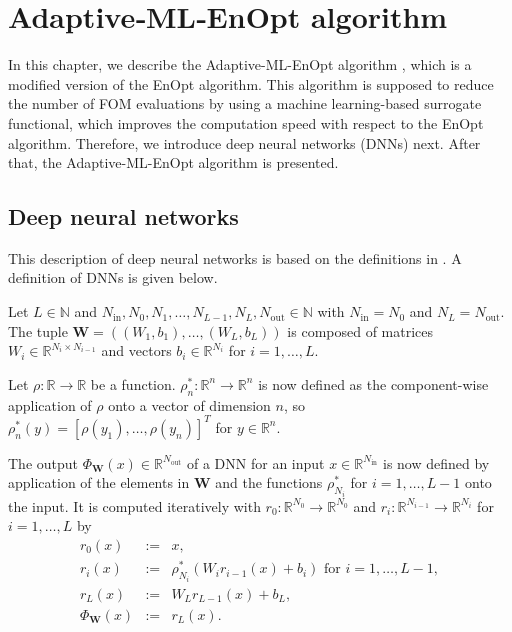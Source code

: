\chapter{\label{ChapterAdaptiveMLEnOptAlgorithm}Adaptive‑ML‑EnOpt algorithm}

In this chapter, we describe the Adaptive-ML-EnOpt algorithm \cite{Keil2022-dj}, which is a modified version of the EnOpt algorithm. This algorithm is supposed to reduce the number of FOM evaluations by using a machine learning-based surrogate functional, which improves the computation speed with respect to the EnOpt algorithm. Therefore, we introduce deep neural networks (DNNs) next. After that, the Adaptive-ML-EnOpt algorithm is presented.

\section{\label{sectionDeepNeuralNetworks}Deep neural networks}

This description of deep neural networks is based on the definitions in \cite{Keil2022-dj}. A definition of DNNs is given below.

\begin{defn}
\label{defDNN}
Let $L\in\mathbb{N}$ and $N_{\mathrm{in}},N_0,N_1,\dotsc,N_{L-1}, N_L,N_{\mathrm{out}}\in\mathbb{N}$ with $N_{\mathrm{in}}=N_0$ and $ N_L=N_{\mathrm{out}}$. The tuple $\mathbf{W}=\left((W_1,b_1),\dotsc,(W_L,b_L)\right)$ is composed of matrices $W_i\in\mathbb{R}^{N_i\times N_{i-1}}$ and vectors $b_i\in\mathbb{R}^{N_i}$ for $i=1,\dotsc,L$.

Let $\rho:\mathbb{R}\to\mathbb{R}$ be a function. $\rho_n^*:\mathbb{R}^n\to\mathbb{R}^n$ is now defined as the component-wise application of $\rho$ onto a vector of dimension $n$, so $\rho_n^*(y)=\left[\rho(y_1),\dotsc,\rho(y_n)\right]^T$ for $y\in\mathbb{R}^n$.

The output $\Phi_\mathbf{W}(x)\in\mathbb{R}^{N_{\mathrm{out}}}$ of a DNN for an input $x\in\mathbb{R}^{N_{\mathrm{in}}}$ is now defined by application of the elements in $\mathbf{W}$ and the functions $\rho_{N_i}^*$ for $i=1,\dotsc,L-1$ onto the input. It is computed iteratively with $r_0:\mathbb{R}^{N_0}\to\mathbb{R}^{N_0}$ and $r_i:\mathbb{R}^{N_{i-1}}\to\mathbb{R}^{N_i}$ for $i=1,\dotsc,L$ by
\begin{eqnarray*}
r_0(x)&:=&x,\\
r_i(x)&:=&\rho_{N_i}^*(W_ir_{i-1}(x)+b_i)\text{ for }i=1,\dotsc,L-1,\\
r_L(x)&:=&W_Lr_{L-1}(x)+b_L,\\
\Phi_\mathbf{W}(x)&:=&r_L(x).
\end{eqnarray*}
\end{defn}

